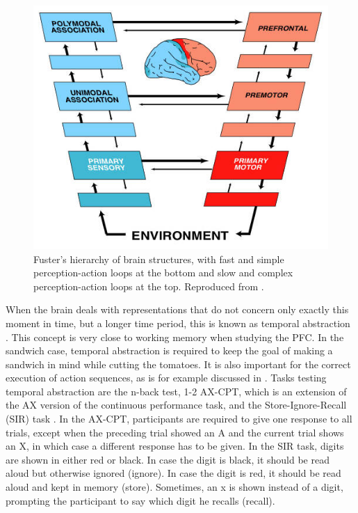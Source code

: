 \documentclass[10pt,a4paper]{report}
\begin{document}
\begin{figure}[tbhp]
\begin{center}
\includegraphics[scale=0.5]{figures/Cortical_Memory_fuster_f2.jpeg}
\caption{Fuster's hierarchy of brain structures, with fast and simple perception-action loops at the bottom and slow and complex perception-action loops at the top. Reproduced from \citet{Fuster2002}.}
\label{fusters}
\end{center}
\end{figure}

When the brain deals with representations that do not concern only exactly this moment in time, but a longer time period, this is known as temporal abstraction \citep{Fuster2001, Kiebel2008}. This concept is very close to working memory when studying the PFC. In the sandwich case, temporal abstraction is required to keep the goal of making a sandwich in mind while cutting the tomatoes. It is also important for the correct execution of action sequences, as is for example discussed in \citet{Elman1990}. Tasks testing temporal abstraction are the n-back test, 1-2 AX-CPT, which is an extension of the AX version of the continuous performance task, and the Store-Ignore-Recall (SIR) task \citep{Osaka2009, O'Reilly2006}. In the AX-CPT, participants are required to give one response to all trials, except when the preceding trial showed an A and the current trial shows an X, in which case a different response has to be given. In the SIR task, digits are shown in either red or black. In case the digit is black, it should be read aloud but otherwise ignored (ignore). In case the digit is red, it should be read aloud and kept in memory (store). Sometimes, an x is shown instead of a digit, prompting the participant to say which digit he recalls (recall).
\end{document}
